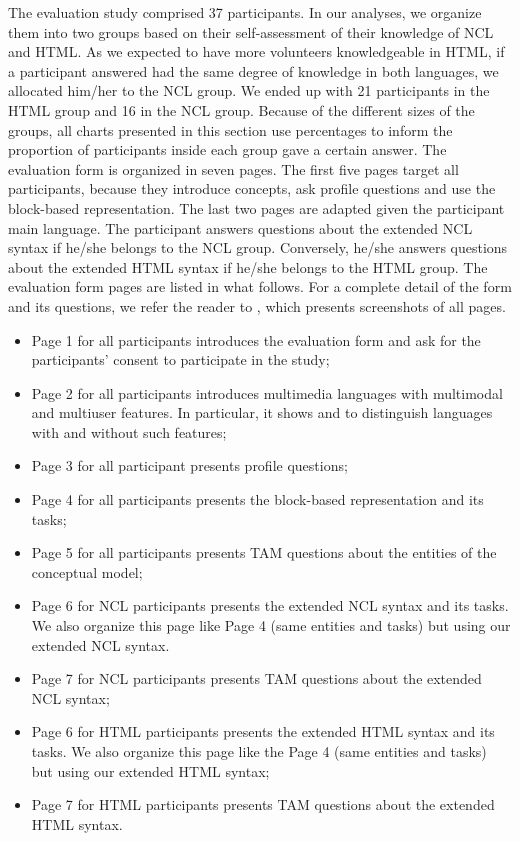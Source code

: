The evaluation study comprised 37 participants. In our analyses, we organize
them into two groups based on their self-assessment of their knowledge of NCL
and HTML. As we expected to have more volunteers knowledgeable in HTML, if a
participant answered had the same degree of knowledge in both languages, we
allocated him/her to the NCL group. We ended up with 21 participants in the HTML
group and 16 in the NCL group. Because of the different sizes of the groups, all
charts presented in this section use percentages to inform the proportion of
participants inside each group gave a certain answer. The evaluation form is
organized in seven pages. The first five pages target all participants, because
they introduce concepts, ask profile questions and use the block-based
representation. The last two pages are adapted given the participant main
language. The participant answers questions about the extended NCL syntax if
he/she belongs to the NCL group. Conversely, he/she answers questions about the
extended HTML syntax if he/she belongs to the HTML group. The evaluation form
pages are listed in what follows. For a complete detail of the form and its
questions, we refer the reader to , which presents screenshots of
all pages.

\begin{itemize}
	\item Page 1 for all participants introduces the evaluation form and ask for
	the participants’ consent to participate in the study;
	\item Page 2 for all participants introduces multimedia languages with
	multimodal and multiuser features. In particular, it shows
	 and  to distinguish
	languages with and without such features;
	\item Page 3 for all participant presents profile questions;
	\item Page 4 for all participants presents the block-based representation and
	its tasks;
	\item Page 5 for all participants presents TAM questions about the entities of
	the conceptual model;
	\item Page 6 for NCL participants presents the extended NCL syntax and its
	tasks. We also organize this page like Page 4 (same entities and tasks) but
	using our extended NCL syntax.
	\item Page 7 for NCL participants presents TAM questions about the extended
	NCL syntax;
	\item Page 6 for HTML participants presents the extended HTML syntax and its
	tasks. We also organize this page like the Page 4 (same entities and tasks)
	but using our extended HTML syntax;
	\item Page 7 for HTML participants presents TAM questions about the extended
	HTML syntax.
\end{itemize}

